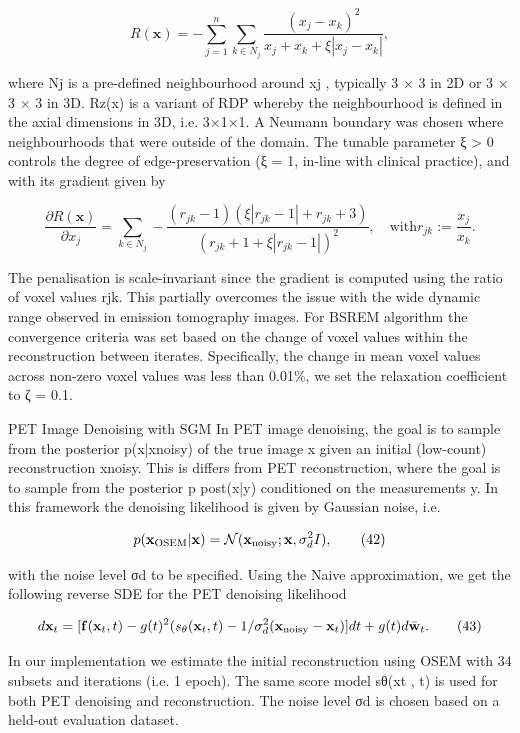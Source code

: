 \documentclass{article}
\begin{document}
$$R(\mathbf{x})=-\sum_{j=1}^{n}\sum_{k\in N_{j}}{\frac{(x_{j}-x_{k})^{2}}{x_{j}+x_{k}+\xi|x_{j}-x_{k}|}},$$

where Nj is a pre-defined neighbourhood around xj , typically 3 × 3 in 2D or 3 × 3 × 3 in 3D. Rz(x) is a variant of RDP whereby the neighbourhood is defined in the axial dimensions in 3D, i.e. 3×1×1. A Neumann boundary was chosen where neighbourhoods that were outside of the domain. The tunable parameter ξ > 0 controls the degree of edge-preservation (ξ = 1, in-line with clinical practice), and with its gradient given by

$$\frac{\partial R(\mathbf{x})}{\partial x_{j}}=\sum_{k\in N_{j}}-\frac{(r_{jk}-1)(\xi|r_{jk}-1|+r_{jk}+3)}{(r_{jk}+1+\xi|r_{jk}-1|)^{2}},\quad\text{with}r_{jk}:=\frac{x_{j}}{x_{k}}.\tag{41}$$

The penalisation is scale-invariant since the gradient is computed using the ratio of voxel values rjk. This partially overcomes the issue with the wide dynamic range observed in emission tomography images. For BSREM algorithm the convergence criteria was set based on the change of voxel values within the reconstruction between iterates. Specifically, the change in mean voxel values across non-zero voxel values was less than 0.01\%, we set the relaxation coefficient to ζ = 0.1.

PET Image Denoising with SGM In PET image denoising, the goal is to sample from the posterior p(x|xnoisy) of the true image x given an initial (low-count) reconstruction xnoisy. This is differs from PET reconstruction, where the goal is to sample from the posterior p post(x|y) conditioned on the measurements y. In this framework the denoising likelihood is given by Gaussian noise, i.e.

$$p({\bf x}_{\rm OSEM}|{\bf x})={\cal N}({\bf x}_{\rm noisy};{\bf x},\sigma_{d}^{2}I),\tag{42}$$

with the noise level σd to be specified. Using the Naive approximation, we get the following reverse SDE for the PET denoising likelihood

$$d{\bf x}_{t}=[{\bf f}({\bf x}_{t},t)-g(t)^{2}(s_{\theta}({\bf x}_{t},t)-1/\sigma_{d}^{2}({\bf x}_{\rm noisy}-{\bf x}_{t})]dt+g(t)d\bar{\bf w}_{t}.\tag{43}$$

In our implementation we estimate the initial reconstruction using OSEM with 34 subsets and iterations (i.e. 1 epoch). The same score model sθ(xt , t) is used for both PET denoising and reconstruction. The noise level σd is chosen based on a held-out evaluation dataset.
\end{document}

